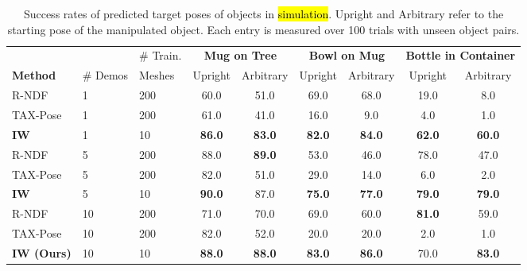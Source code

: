 \documentclass{article}
\begin{document}
\begin{table}[h]
    \centering
    \begin{tabular}{lllcccccc}
        \toprule
          & & \# Train. & \multicolumn{2}{c}{\textbf{Mug on Tree}} & \multicolumn{2}{c}{\textbf{Bowl on Mug}} & \multicolumn{2}{c}{\textbf{Bottle in Container}} \\
         \textbf{Method} & \# Demos & Meshes & Upright & Arbitrary & Upright & Arbitrary & Upright & Arbitrary \\
         \midrule
         R-NDF & 1 & 200 & 60.0 & 51.0 & 69.0 & 68.0 & 19.0 & 8.0 \\
         TAX-Pose & 1 & 200 & 61.0 & 41.0 & 16.0 & 9.0 & 4.0 & 1.0 \\
         \textbf{IW} & 1 & 10 & \textbf{86.0} & \textbf{83.0} & \textbf{82.0} & \textbf{84.0} & \textbf{62.0} & \textbf{60.0} \\
         \midrule
         R-NDF & 5 & 200 & 88.0 & \textbf{89.0} & 53.0 & 46.0 & 78.0 & 47.0 \\
         TAX-Pose & 5 & 200 & 82.0 & 51.0 & 29.0 & 14.0 & 6.0 & 2.0 \\
         \textbf{IW} & 5 & 10 & \textbf{90.0} & 87.0 & \textbf{75.0} & \textbf{77.0} & \textbf{79.0} & \textbf{79.0} \\
         \midrule
         R-NDF \cite{simeonov22se} & 10 & 200 & 71.0 & 70.0 & 69.0 & 60.0 & \textbf{81.0} & 59.0 \\
         TAX-Pose \cite{pan22taxpose} & 10 & 200 & 82.0 & 52.0 & 20.0 & 20.0 & 2.0 & 1.0 \\
         \textbf{IW (Ours)} & 10 & 10 & \textbf{88.0} & \textbf{88.0} & \textbf{83.0} & \textbf{86.0} & 70.0 & \textbf{83.0} \\
         \bottomrule
    \end{tabular}
    \caption{Success rates of predicted target poses of objects in \hl{simulation}. Upright and Arbitrary refer to the starting pose of the manipulated object. Each entry is measured over 100 trials with unseen object pairs.}
    \label{tab:simulation}
\end{table}
\end{document}
